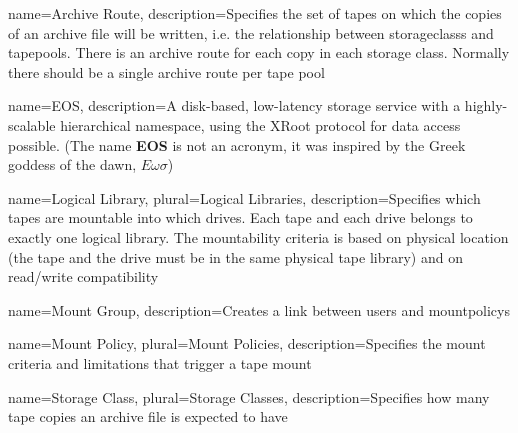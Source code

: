 





{
  name={Archive Route},
  description={Specifies the set of tapes on which the copies of an archive file will be written, i.e. the relationship
    between \glspl{storageclass} and \glspl{tapepool}. There is an archive route for each copy in each storage class.
    Normally there should be a single archive route per tape pool}
}

{
  name={EOS},
  description={A disk-based, low-latency storage service with a highly-scalable hierarchical namespace, using the XRoot
    protocol for data access possible. (The name \textbf{EOS} is not an acronym, it was inspired by the Greek goddess of
    the dawn, $E\omega\sigma$)}
}

{
  name={Logical Library},
  plural={Logical Libraries},
  description={Specifies which tapes are mountable into which drives. Each tape and each drive belongs to exactly one
    logical library. The mountability criteria is based on physical location (the tape and the drive must be in the same
    physical tape library) and on read\slash write compatibility}
}

{
  name={Mount Group},
  description={Creates a link between \glspl{user} and \glspl{mountpolicy}}
}

{
  name={Mount Policy},
  plural={Mount Policies},
  description={Specifies the mount criteria and limitations that trigger a tape mount}
}

{
  name={Storage Class},
  plural={Storage Classes},
  description={Specifies how many tape copies an archive file is expected to have}
}

